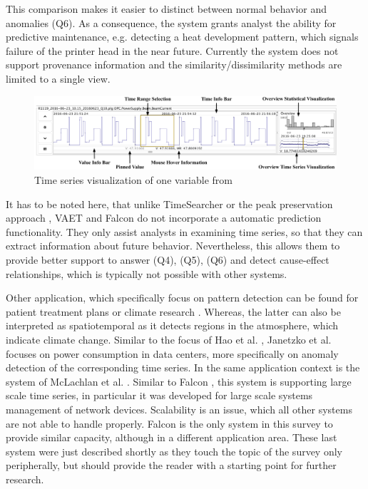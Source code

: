 \documentclass[electronic]{vgtc}             %
\begin{document}
This comparison makes it easier to distinct between normal behavior and anomalies (Q6). 
As a consequence, the system grants analyst the ability for predictive maintenance, e.g. detecting a heat development pattern, which signals failure of the printer head in the near future. 
Currently the system does not support provenance information and the similarity/dissimilarity methods are limited to a single view.

\begin{figure}[htb]
	\centering
	\includegraphics[width=\columnwidth]{Falcon}
	\caption{Time series visualization of one variable from \cite{steed:2017}
	}
	\label{fig:falcon}
\end{figure}

It has to be noted here, that unlike TimeSearcher \cite{Hochheiser:2004, buono:2005, buono:2007} or the peak preservation approach \cite{Hao:2012}, VAET \cite{Xie:2014} and Falcon \cite{steed:2017} do not incorporate a automatic prediction functionality.
They only assist analysts in examining time series, so that they can extract information about future behavior. 
Nevertheless, this allows them to provide better support to answer (Q4), (Q5), (Q6) and detect cause-effect relationships, which is typically not possible with other systems. 

Other application, which specifically focus on pattern detection can be found for patient treatment plans \cite{Gschwandtner:2011} or climate research \cite{Kehrer:2008}.
Whereas, the latter can also be interpreted as spatiotemporal as it detects regions in the atmosphere, which indicate climate change.
Similar to the focus of Hao et al. \cite{Hao:2009, Hao:2011}, Janetzko et al. \cite{janetzko:2014} focuses on power consumption in data centers, more specifically on anomaly detection of the corresponding time series.
In the same application context is the system of McLachlan et al. \cite{McLachlan:2008}. 
Similar to Falcon \cite{steed:2017}, this system is supporting large scale time series, in particular it was developed for large scale systems management of network devices.
Scalability is an issue, which all other systems are not able to handle properly.
Falcon \cite{steed:2017} is the only system in this survey to provide similar capacity, although in a different application area. 
These last system were just described shortly as they touch the topic of the survey only peripherally, but should provide the reader with a starting point for further research.
\end{document}
